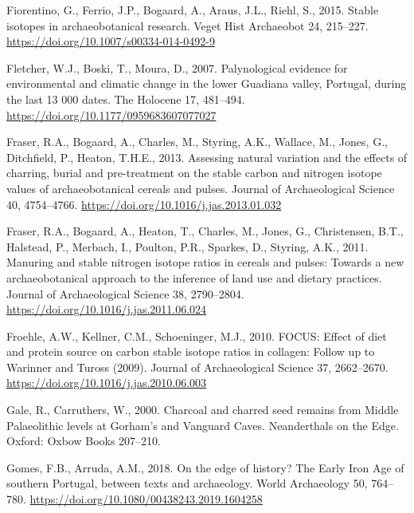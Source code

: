 \documentclass[preprint, 3p, authoryear]{elsarticle} %
\newlength{\cslhangindent}
\newlength{\cslentryspacingunit} %
\newenvironment{CSLReferences}[2] %
 {%
  \setlength{\parindent}{0pt}
  \ifodd #1
  \let\oldpar\par
  \def\par{\hangindent=\cslhangindent\oldpar}
  \fi
  \setlength{\parskip}{#2\cslentryspacingunit}
 }%
 {}
\begin{document}
\begin{CSLReferences}{1}{0}
\leavevmode{}%
Fiorentino, G., Ferrio, J.P., Bogaard, A., Araus, J.L., Riehl, S., 2015. Stable isotopes in archaeobotanical research. Veget Hist Archaeobot 24, 215--227. \url{https://doi.org/10.1007/s00334-014-0492-9}

\leavevmode{}%
Fletcher, W.J., Boski, T., Moura, D., 2007. Palynological evidence for environmental and climatic change in the lower {Guadiana} valley, {Portugal}, during the last 13 000 dates. The Holocene 17, 481--494. \url{https://doi.org/10.1177/0959683607077027}

\leavevmode{}%
Fraser, R.A., Bogaard, A., Charles, M., Styring, A.K., Wallace, M., Jones, G., Ditchfield, P., Heaton, T.H.E., 2013. Assessing natural variation and the effects of charring, burial and pre-treatment on the stable carbon and nitrogen isotope values of archaeobotanical cereals and pulses. Journal of Archaeological Science 40, 4754--4766. \url{https://doi.org/10.1016/j.jas.2013.01.032}

\leavevmode{}%
Fraser, R.A., Bogaard, A., Heaton, T., Charles, M., Jones, G., Christensen, B.T., Halstead, P., Merbach, I., Poulton, P.R., Sparkes, D., Styring, A.K., 2011. Manuring and stable nitrogen isotope ratios in cereals and pulses: Towards a new archaeobotanical approach to the inference of land use and dietary practices. Journal of Archaeological Science 38, 2790--2804. \url{https://doi.org/10.1016/j.jas.2011.06.024}

\leavevmode{}%
Froehle, A.W., Kellner, C.M., Schoeninger, M.J., 2010. {FOCUS}: Effect of diet and protein source on carbon stable isotope ratios in collagen: Follow up to {Warinner} and {Tuross} (2009). Journal of Archaeological Science 37, 2662--2670. \url{https://doi.org/10.1016/j.jas.2010.06.003}

\leavevmode{}%
Gale, R., Carruthers, W., 2000. Charcoal and charred seed remains from {Middle Palaeolithic} levels at {Gorham}'s and {Vanguard Caves}. Neanderthals on the Edge. Oxford: Oxbow Books 207--210.

\leavevmode{}%
Gomes, F.B., Arruda, A.M., 2018. On the edge of history? {The Early Iron Age} of southern {Portugal}, between texts and archaeology. World Archaeology 50, 764--780. \url{https://doi.org/10.1080/00438243.2019.1604258}


\end{CSLReferences}
\end{document}
